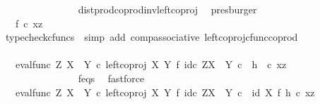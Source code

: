\begin{isabellebody}
\ \ \ \ \ \ \ \ \ \ \ \ \ \ \isamarkupfalse%
\ dist{\isacharunderscore}{\kern0pt}prod{\isacharunderscore}{\kern0pt}coprod{\isacharunderscore}{\kern0pt}inv{}{\isacharunderscore}{\kern0pt}left{\isacharunderscore}{\kern0pt}coproj\ \isamarkupfalse%
\ presburger\isanewline
\ \ \ \ \ \ \ \ \ \ \ \ \isamarkupfalse%
\ \isamarkupfalse%
\ {\isachardoublequoteopen}{\isachardot}{\kern0pt}{\isachardot}{\kern0pt}{\isachardot}{\kern0pt}\ {\isacharequal}{\kern0pt}\ f\isactrlsup {\isasymflat}\ {\isasymcirc}\isactrlsub c\ {\isasymlangle}x{\isacharcomma}{\kern0pt}z{\isasymrangle}{\isachardoublequoteclose}\isanewline
\ \ \ \ \ \ \ \ \ \ \ \ \ \ \isamarkupfalse%
\ {\isacharparenleft}{\kern0pt}typecheck{\isacharunderscore}{\kern0pt}cfuncs{\isacharcomma}{\kern0pt}\ \ simp\ add{\isacharcolon}{\kern0pt}\ comp{\isacharunderscore}{\kern0pt}associative{}\ left{\isacharunderscore}{\kern0pt}coproj{\isacharunderscore}{\kern0pt}cfunc{\isacharunderscore}{\kern0pt}coprod{\isacharparenright}{\kern0pt}\isanewline
\ \ \ \ \ \ \ \ \ \ \ \ \isamarkupfalse%
\ \isamarkupfalse%
\ {\isachardoublequoteopen}{\isachardot}{\kern0pt}{\isachardot}{\kern0pt}{\isachardot}{\kern0pt}\ {\isacharequal}{\kern0pt}\ {\isacharparenleft}{\kern0pt}{\isacharparenleft}{\kern0pt}eval{\isacharunderscore}{\kern0pt}func\ Z\ {\isacharparenleft}{\kern0pt}X\ {\isasymCoprod}\ Y{\isacharparenright}{\kern0pt}\ {\isasymcirc}\isactrlsub c\ left{\isacharunderscore}{\kern0pt}coproj\ X\ Y\ {\isasymtimes}\isactrlsub f\ id\isactrlsub c\ {\isacharparenleft}{\kern0pt}Z\isactrlbsup {\isacharparenleft}{\kern0pt}X\ {\isasymCoprod}\ Y{\isacharparenright}{\kern0pt}\isactrlesup {\isacharparenright}{\kern0pt}{\isacharparenright}{\kern0pt}\isactrlsup {\isasymsharp}\ {\isasymcirc}\isactrlsub c\ \ h{\isacharparenright}{\kern0pt}\isactrlsup {\isasymflat}\ \ {\isasymcirc}\isactrlsub c\ {\isasymlangle}x{\isacharcomma}{\kern0pt}z{\isasymrangle}{\isachardoublequoteclose}\isanewline
\ \ \ \ \ \ \ \ \ \ \ \ \ \ \isamarkupfalse%
\ f{\isacharunderscore}{\kern0pt}eqs\ \isamarkupfalse%
\ fastforce\isanewline
\ \ \ \ \ \ \ \ \ \ \ \ \isamarkupfalse%
\ \isamarkupfalse%
\ {\isachardoublequoteopen}{\isachardot}{\kern0pt}{\isachardot}{\kern0pt}{\isachardot}{\kern0pt}\ {\isacharequal}{\kern0pt}\ {\isacharparenleft}{\kern0pt}{\isacharparenleft}{\kern0pt}{\isacharparenleft}{\kern0pt}eval{\isacharunderscore}{\kern0pt}func\ Z\ {\isacharparenleft}{\kern0pt}X\ {\isasymCoprod}\ Y{\isacharparenright}{\kern0pt}\ {\isasymcirc}\isactrlsub c\ left{\isacharunderscore}{\kern0pt}coproj\ X\ Y\ {\isasymtimes}\isactrlsub f\ id\isactrlsub c\ {\isacharparenleft}{\kern0pt}Z\isactrlbsup {\isacharparenleft}{\kern0pt}X\ {\isasymCoprod}\ Y{\isacharparenright}{\kern0pt}\isactrlesup {\isacharparenright}{\kern0pt}{\isacharparenright}{\kern0pt}\isactrlsup {\isasymsharp}\isactrlsup {\isasymflat}{\isacharparenright}{\kern0pt}\ {\isasymcirc}\isactrlsub c\ \ {\isacharparenleft}{\kern0pt}id\ X\ {\isasymtimes}\isactrlsub f\ h{\isacharparenright}{\kern0pt}{\isacharparenright}{\kern0pt}\ {\isasymcirc}\isactrlsub c\ {\isasymlangle}x{\isacharcomma}{\kern0pt}z{\isasymrangle}{\isachardoublequoteclose}\isanewline

\end{isabellebody}
